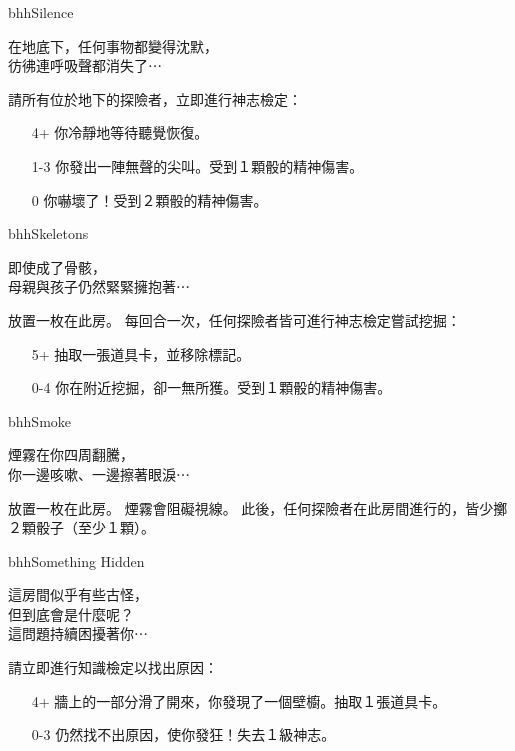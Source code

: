\linebreak[0]%
\begin{EventCard}{bhh}{Silence}
  \begin{CardStory}
    在地底下，任何事物都變得沈默，\\
    彷彿連呼吸聲都消失了⋯
  \end{CardStory}
  請所有位於地下的探險者，立即進行神志檢定：
  \begin{itemize}
    \item[4+] 你冷靜地等待聽覺恢復。
    \item[1-3] 你發出一陣無聲的尖叫。受到１顆骰的精神傷害。
    \item[0] 你嚇壞了！受到２顆骰的精神傷害。
  \end{itemize}
\end{EventCard}%
\linebreak[0]%
\begin{EventCard}{bhh}{Skeletons}
  \begin{CardStory}
    即使成了骨骸，\\
    母親與孩子仍然緊緊擁抱著⋯
  \end{CardStory}
  放置一枚在此房。\smallbreak
  每回合一次，任何探險者皆可進行神志檢定嘗試挖掘：
  \begin{itemize}
    \item[5+] 抽取一張道具卡，並移除標記。
    \item[0-4] 你在附近挖掘，卻一無所獲。受到１顆骰的精神傷害。
  \end{itemize}
\end{EventCard}%
\linebreak[0]%
\begin{EventCard}{bhh}{Smoke}
  \begin{CardStory}
    煙霧在你四周翻騰，\\
    你一邊咳嗽、一邊擦著眼淚⋯
  \end{CardStory}
  放置一枚在此房。\smallbreak
  煙霧會阻礙視線。\smallbreak
  此後，任何探險者在此房間進行的，皆少擲２顆骰子（至少１顆）。\smallbreak
\end{EventCard}%
\linebreak[0]%
\begin{EventCard}{bhh}{Something Hidden}
  \begin{CardStory}
    這房間似乎有些古怪，\\
    但到底會是什麼呢？\\
    這問題持續困擾著你⋯
  \end{CardStory}
  請立即進行知識檢定以找出原因：
  \begin{itemize}
    \item[4+] 牆上的一部分滑了開來，你發現了一個壁櫥。抽取１張道具卡。
    \item[0-3] 仍然找不出原因，使你發狂！失去１級神志。
  \end{itemize}
\end{EventCard}%
